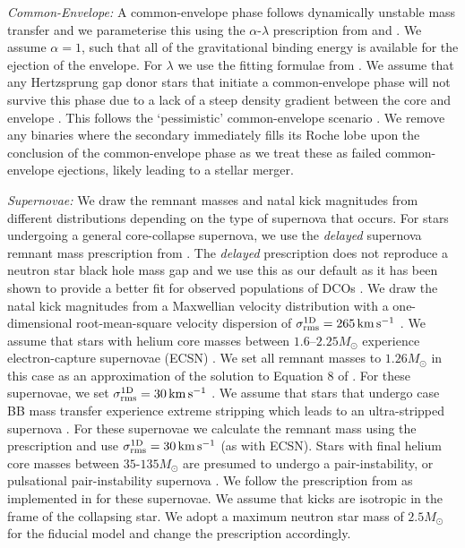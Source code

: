 \textit{Common-Envelope:} A common-envelope phase follows dynamically unstable mass transfer and we parameterise this using the $\alpha$-$\lambda$ prescription from \citet{Webbink+1984} and \citet{deKool+1990}. We assume $\alpha = 1$, such that all of the gravitational binding energy is available for the ejection of the envelope. For $\lambda$ we use the fitting formulae from \citet{Xu+2010, Xu+2010a}. We assume that any Hertzsprung gap donor stars that initiate a common-envelope phase will not survive this phase due to a lack of a steep density gradient between the core and envelope \citep{Taam+2000, Ivanova+2004, Klencki+2021}. This follows the `pessimistic' common-envelope scenario \citep[c.f.][]{Belczynski+2007}. We remove any binaries where the secondary immediately fills its Roche lobe upon the conclusion of the common-envelope phase as we treat these as failed common-envelope ejections, likely leading to a stellar merger.

\textit{Supernovae:} We draw the remnant masses and natal kick magnitudes from different distributions depending on the type of supernova that occurs. For stars undergoing a general core-collapse supernova, we use the \textit{delayed} supernova remnant mass prescription from \citet{Fryer+2012}. The \textit{delayed} prescription does not reproduce a neutron star black hole mass gap and we use this as our default as it has been shown to provide a better fit for observed populations of DCOs \citep[e.g.][]{Vigna-Gomez+2018}. We draw the natal kick magnitudes from a Maxwellian velocity distribution with a one-dimensional root-mean-square velocity dispersion of $\sigma_{\rm rms}^{\rm 1D} = 265 \unit{km}{s^{-1}}$ \citep{Lyne+1994, Hobbs+2005}. We assume that stars with helium core masses between $1.6$--$2.25 \unit{M_{\odot}}$ \citep{Hurley+2002} experience electron-capture supernovae (ECSN) \citep{Nomoto+1984, Nomoto+1987, Ivanova+2008}. We set all remnant masses to $1.26 \unit{M_{\odot}}$ in this case as an approximation of the solution to Equation 8 of \citet{Timmes+1996}. For these supernovae, we set $\sigma_{\rm rms}^{\rm 1D} = 30 \unit{km}{s^{-1}}$ \citep[e.g.][]{Pfahl+2002, Podsiadlowski+2004}. We assume that stars that undergo case BB mass transfer \citep{Dewi+2002} experience extreme stripping which leads to an ultra-stripped supernova \citep{Tauris+2013, Tauris+2015}. For these supernovae we calculate the remnant mass using the \citet{Fryer+2012} prescription and use $\sigma_{\rm rms}^{\rm 1D} = 30 \unit{km}{s^{-1}}$ (as with ECSN). Stars with final helium core masses between $35$-$135 \unit{M_{\odot}}$ are presumed to undergo a pair-instability, or pulsational pair-instability supernova \citep[e.g.][]{Woosley+2007, Farmer+2019}. We follow the prescription from \citet{Marchant+2019} as implemented in \citep{Stevenson+2019} for these supernovae. We assume that kicks are isotropic in the frame of the collapsing star. We adopt a maximum neutron star mass of $2.5 \unit{M_{\odot}}$ \citep[e.g.][]{Kalogera+1996, Fryer+2015, Margalit+2017} for the fiducial model and change the \citet{Fryer+2012} prescription accordingly.

